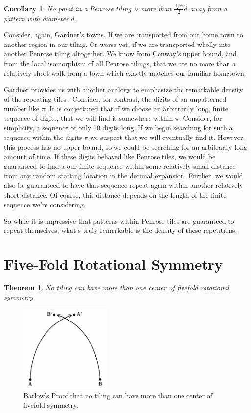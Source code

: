 \documentclass[
  oneside,
  11pt, a4paper,
  footinclude=true,
  headinclude=true,
  cleardoublepage=empty
]{scrbook}
\newtheorem{mythm}{Theorem}
\newtheorem{mycor}{Corollary}
\begin{document}
\begin{mycor}
No point in a Penrose tiling is more than $\frac{\sqrt[3]{\phi}}{2}d$ away from a pattern with diameter $d$.
\end{mycor}

Consider, again, Gardner's towns. If we are transported from our home town to another region in our tiling. Or worse yet, if we are transported wholly into another Penrose tiling altogether. We know from Conway's upper bound, and from the local isomorphism of all Penrose tilings, that we are no more than a relatively short walk from a town which exactly matches our familiar hometown.

Gardner provides us with another analogy to emphasize the remarkable density of the repeating tiles  \cite{Gardner1997}. Consider, for contrast, the digits of an unpatterned number like $\pi$. It is conjectured that if we choose an arbitrarily long, finite sequence of digits, that we will find it somewhere within $\pi$. Consider, for simplicity, a sequence of only 10 digits long. If we begin searching for such a sequence within the digits $\pi$ we suspect that we will eventually find it. However, this process has no upper bound, so we could be searching for an arbitrarily long amount of time. If these digits behaved like Penrose tiles, we would be guaranteed to find a our finite sequence within some relatively small distance from any random starting location in the decimal expansion. Further, we would also be guaranteed to have that sequence repeat again within another relatively short distance. Of course, this distance depends on the length of the finite sequence we're considering.

So while it is impressive that patterns within Penrose tiles are guaranteed to repeat themselves, what's truly remarkable is the density of these repetitions. 
\section{Five-Fold Rotational Symmetry} %
\begin{mythm}
No tiling can have more than one center of fivefold rotational symmetry.
\label{symthm}
\end{mythm}

\begin{figure}[H]
	\centering
	\includegraphics[width=0.4\textwidth]{proof}
    \caption{Barlow's Proof that no tiling can have more than one center of fivefold symmetry. \cite{Gardner1997}}
    \label{fig:fivefoldproof}
\end{figure}
\end{document}

